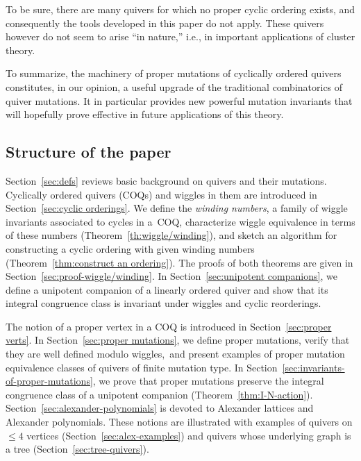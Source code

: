 \documentclass[11pt, letterpaper]{amsart}
\theoremstyle{definition}
\numberwithin{equation}{section}
\def\ZZ{{\mathbb Z}}
\def\GL{{\operatorname{GL}}}
\begin{document}
To be sure, there are many quivers for which no proper cyclic ordering exists, 
and consequently the tools developed in this paper do not apply. 
These quivers however do not seem to arise ``in nature,'' i.e., in important applications of cluster theory. 


To summarize, the machinery of proper mutations of cyclically ordered quivers \linebreak[3]
constitutes,
in our opinion, a useful upgrade of the traditional combinatorics of quiver mutations.  
It in particular provides new powerful mutation invariants that will hopefully  
prove effective in future applications of this theory. 

\newpage

\subsection*{Structure of the paper}
Section~\ref{sec:defs} reviews basic background on quivers and their mutations. 
Cyclically ordered quivers (COQs) and wiggles in them are introduced in Section~\ref{sec:cyclic orderings}.  
We define the \emph{winding numbers}, a family of wiggle invariants associated to cycles in a~COQ, 
characterize wiggle equivalence in terms of these numbers (Theorem~\ref{th:wiggle/winding}), 
and sketch an algorithm for constructing a cyclic ordering with given winding numbers (Theorem~\ref{thm:construct an ordering}). 
The proofs of both theorems are given in Section~\ref{sec:proof-wiggle/winding}. 
In Section~\ref{sec:unipotent companions}, we define a unipotent companion of a linearly ordered quiver 
and show that its integral congruence class is invariant under wiggles and cyclic reorderings.

The notion of a proper vertex in a COQ is introduced in Section~\ref{sec:proper verts}.
In Section~\ref{sec:proper mutations}, we define proper mutations,  
verify that they are well defined modulo wiggles,~and 
present examples of proper mutation equivalence classes of quivers of finite mutation type.
In Section~\ref{sec:invariants-of-proper-mutations}, we prove that proper mutations preserve 
the integral congruence class of a unipotent companion %
(Theorem~\ref{thm:I-N-action}). %
Section~\ref{sec:alexander-polynomials} is devoted to Alexander lattices and Alexander poly\-nomials. 
These notions are illustrated with examples of quivers on $\le 4$ vertices (Section~\ref{sec:alex-examples})
and quivers whose underlying graph is a tree (Section~\ref{sec:tree-quivers}). 
\end{document}
